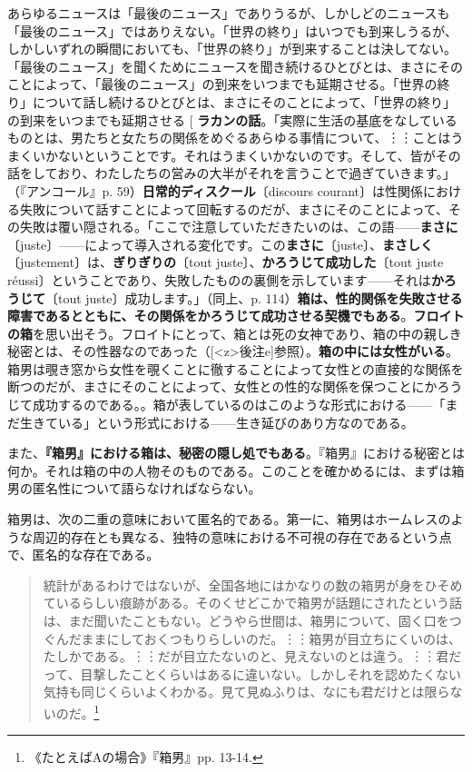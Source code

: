 \documentclass[9pt,b5j,twoside,twocolumn]{utarticle}
\makeatletter
\def\yakuchu{%
\@ifnextchar[\@xfootnote %
{\stepcounter{yakuchu}%
\protected@xdef\@thefnmark{\theyakuchu}%
\@footnotemark\@footnotetext}}
\makeatother
\begin{document}
あらゆるニュースは「最後のニュース」でありうるが、しかしどのニュースも「最後のニュース」ではありえない。「世界の終り」はいつでも到来しうるが、しかしいずれの瞬間においても、「世界の終り」が到来することは決してない。「最後のニュース」を聞くためにニュースを聞き続けるひとびとは、まさにそのことによって、「最後のニュース」の到来をいつまでも延期させる。「世界の終り」について話し続けるひとびとは、まさにそのことによって、「世界の終り」の到来をいつまでも延期させる\yakuchu{\textbf{ラカンの話}。「実際に生活の基底をなしているものとは、男たちと女たちの関係をめぐるあらゆる事情について、︙︙ことはうまくいかないということです。それはうまくいかないのです。そして、皆がその話をしており、わたしたちの営みの大半がそれを言うことで過ぎていきます。」（『アンコール』p. 59）\textbf{日常的ディスクール}〔discours courant〕は性関係における失敗について話すことによって回転するのだが、まさにそのことによって、その失敗は覆い隠される。「ここで注意していただきたいのは、この語------\textbf{まさに}〔juste〕------によって導入される変化です。この\textbf{まさに}〔juste〕、\textbf{まさしく}〔justement〕は、\textbf{ぎりぎりの}〔tout juste〕、\textbf{かろうじて成功した}〔tout juste r\'eussi〕ということであり、失敗したものの裏側を示しています------それは\textbf{かろうじて}〔tout juste〕成功します。」（同上、p. 114）\textbf{箱は、性的関係を失敗させる障害であるとともに、その関係をかろうじて成功させる契機でもある}。\textbf{フロイトの箱}を思い出そう。フロイトにとって、箱とは死の女神であり、箱の中の親しき秘密とは、その性器なのであった（[\pbox<z>{後注e}]参照）。\textbf{箱の中には女性がいる}。箱男は覗き窓から女性を覗くことに徹することによって女性との直接的な関係を断つのだが、まさにそのことによって、女性との性的な関係を保つことにかろうじて成功するのである。}。箱が表しているのはこのような形式における------「まだ生きている」という形式における------生き延びのあり方なのである。

また、\textbf{『箱男』における箱は、秘密の隠し処でもある}。『箱男』における秘密とは何か。それは箱の中の人物そのものである。このことを確かめるには、まずは箱男の匿名性について語らなければならない。

箱男は、次の二重の意味において匿名的である。第一に、箱男はホームレスのような周辺的存在とも異なる、独特の意味における不可視の存在であるという点で、匿名的な存在である。

\begin{quotation}
統計があるわけではないが、全国各地にはかなりの数の箱男が身をひそめているらしい痕跡がある。そのくせどこかで箱男が話題にされたという話は、まだ聞いたこともない。どうやら世間は、箱男について、固く口をつぐんだままにしておくつもりらしいのだ。︙︙箱男が目立ちにくいのは、たしかである。︙︙だが目立たないのと、見えないのとは違う。︙︙君だって、目撃したことくらいはあるに違いない。しかしそれを認めたくない気持も同じくらいよくわかる。見て見ぬふりは、なにも君だけとは限らないのだ。\footnote{《たとえばAの場合》『箱男』pp. 13-14.}
\end{quotation}
\end{document}
